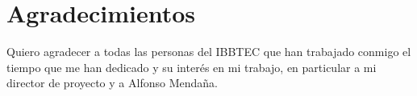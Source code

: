 \section{Agradecimientos}

Quiero agradecer a todas las personas del IBBTEC que han trabajado conmigo el tiempo que me han dedicado y su interés en mi trabajo, en particular a mi director de proyecto y a Alfonso Mendaña.